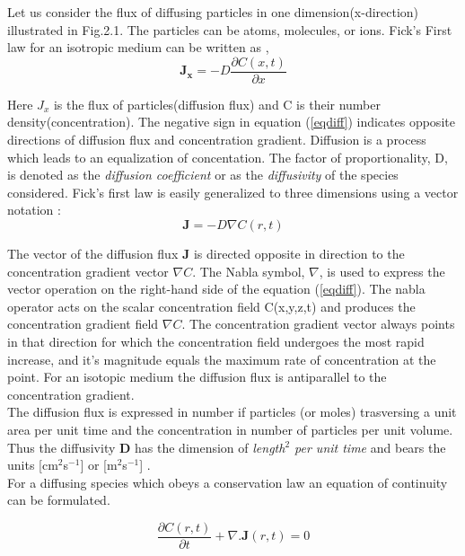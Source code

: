  \noindent Let us consider the flux of diffusing particles in one dimension(x-direction) illustrated in Fig.2.1. The particles can be atoms, molecules, or ions. Fick's First law for an isotropic medium can be written as \cite{mehrer},
 \begin{equation}
 \mathbf{J_x} = -D\frac{\partial C(x,t)}{\partial x}
 \label{eqdiff}
 \end{equation}
 
 \noindent Here $J_x$ is the flux of particles(diffusion flux) and C is their number density(concentration). The negative sign in equation (\ref{eqdiff}) indicates opposite directions of diffusion flux and concentration gradient. Diffusion is a process which leads to an equalization of concentation. The factor of proportionality, D, is denoted as the \emph{diffusion coefficient } or as the \emph{diffusivity} 
 of the species considered. Fick's first law is easily generalized to three dimensions using a vector notation \cite{mehrer}: 
              \begin{equation}\label{1}
              \mathbf{J}=-D\nabla{C(r,t)}
              \end{equation}
      
 \noindent The vector of the diffusion flux \textbf{J} is directed opposite in direction to the concentration gradient vector $\nabla{C}$. The Nabla symbol, $\nabla$, is used to express the vector operation on the right-hand side of the equation (\ref{eqdiff}). The nabla operator  acts on the scalar concentration field C(x,y,z,t) and produces the concentration gradient field $\nabla{C}$. The concentration gradient vector always points in that direction for which the concentration  field undergoes the most rapid increase, and it's magnitude equals the maximum rate of concentration at the point. For an isotopic medium the diffusion flux is antiparallel to the concentration gradient.\\
 
 \noindent The diffusion flux is expressed in number if particles (or moles) trasversing a unit area per unit time and the concentration in number of particles per unit volume. Thus the diffusivity \textbf{D} has the dimension of \emph{length$^2$ per unit time } and bears the units [cm$^2$s$^{-1}$] or [m$^2$s$^{-1}$] \cite{mehrer}.\\
 
  For a diffusing species which obeys a conservation law an equation of continuity can be formulated.
 
 \begin{equation}\label{2}
 \frac{\partial C(r,t)}{\partial t} + \nabla . \mathbf{J}(r,t) = 0 
 \end{equation}
 
